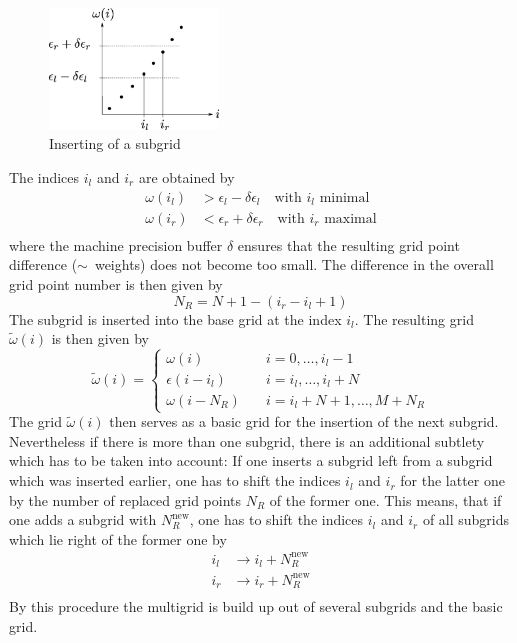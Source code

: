 \begin{figure}[h]
	\centering
	\includegraphics[width=0.4\textwidth]{pics/subgrid_inserting.eps}
	\caption{Inserting of a subgrid}
	\label{fig:subgrid_inserting}
\end{figure}
The indices $i_l$ and $i_r$ are obtained by
\begin{align*}
	\omega(i_l) & > \epsilon_l - \delta \epsilon_l \quad \text{with } i_l \text{ minimal} \\
	\omega(i_r) & < \epsilon_r + \delta \epsilon_r \quad \text{with } i_r \text{ maximal} \\
\end{align*}
where the machine precision buffer $\delta$ ensures that the resulting grid point difference ($\sim$~weights) does not become too small. 
The difference in the overall grid point number is then given by
\[
	N_R=N +1 - (i_r-i_l+1)
\]
The subgrid is inserted into the base grid at the index $i_l$. The resulting grid $\tilde \omega(i)$ is then given by
\[
	\tilde \omega(i)=\begin{cases}
			\omega(i) \quad & i = 0,\dots,i_l-1 \\
			\epsilon(i-i_l) \quad & i=i_l,\dots,i_l+N\\
			\omega(i-N_R) \quad & i=i_l+N+1,\dots,M+N_R
 	          \end{cases}
\]
The grid $\tilde \omega(i)$ then serves as a basic grid for the insertion of the next subgrid. Nevertheless if there is more than one subgrid, there is an additional subtlety which has to be taken into account: If one inserts a subgrid left from a subgrid which was inserted earlier, one has to shift the indices $i_l$ and $i_r$ for the latter one by the number of replaced grid points $N_R$ of the former one. This means, that if one adds a subgrid with $N_R^\text{new}$, one has to shift the indices $i_l$ and $i_r$ of all subgrids which lie right of the former one by
\begin{align*}
	i_l &\to i_l + N_R^\text{new} \\
	i_r &\to i_r + N_R^\text{new} \\
\end{align*}
By this procedure the multigrid is build up out of several subgrids and the basic grid.

